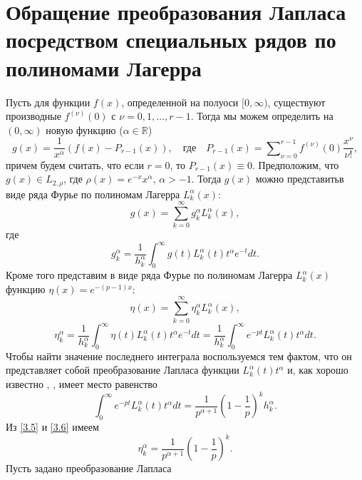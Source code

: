 \section{Обращение преобразования Лапласа посредством специальных рядов по полиномами Лагерра}
Пусть для функции $f(x)$, определенной на полуоси $[0,\infty)$, существуют производные $f^{(\nu)}(0)$ с $\nu=0,1,\ldots, r-1$. Тогда мы можем определить на $(0,\infty)$  новую функцию ($\alpha\in\mathbb{R}$)
\begin{equation}\label{3.1}
g(x)=\frac{1}{x^\alpha}(f(x)-P_{r-1}(x)),\quad \text{где} \quad P_{r-1}(x)=\sum\nolimits_{\nu=0}^{r-1}f^{(\nu)}(0)\frac{x^\nu}{\nu!},
\end{equation}
причем будем считать, что если $r=0$, то $P_{r-1}(x)\equiv0$. Предположим, что $g(x)\in L_{2,\rho}$, где $\rho(x)=e^{-x}x^\alpha$, $\alpha>-1$.
Тогда  $g(x)$ можно представитьв виде ряда Фурье по  полиномам Лагерра $L_k^\alpha(x)$:
\begin{equation}\label{3.2}
g(x)=\sum_{k=0}^{\infty} g_k^\alpha L_k^\alpha(x),
\end{equation}
где
\begin{equation}\label{3.3}
 g_k^\alpha=\frac{1}{h_k^\alpha} \int_0^\infty g(t) L_k^\alpha(t)t^\alpha e^{-t}dt.
\end{equation}
Кроме того представим в виде ряда Фурье по полиномам Лагерра $L_k^\alpha(x)$  функцию $\eta(x)=e^{-(p-1)x}$:
\begin{equation}\label{3.4}
\eta(x)=\sum_{k=0}^{\infty} \eta_k^\alpha L_k^\alpha(x),
\end{equation}
\begin{equation}\label{3.5}
 \eta_k^\alpha=\frac{1}{h_k^\alpha} \int_0^\infty \eta(t) L_k^\alpha(t)t^\alpha e^{-t}dt=\frac{1}{h_k^\alpha} \int_0^\infty e^{-pt}L_k^\alpha(t)t^\alpha dt.
\end{equation}
Чтобы найти значение последнего интеграла воспользуемся тем фактом, что он представляет собой преобразование Лапласа функции
$L_k^\alpha(t)t^\alpha$ и, как хорошо известно \cite{DitPrud}, \cite{KrylovSkob}, имеет место равенство
\begin{equation}\label{3.6}
  \int_0^\infty e^{-pt}L_k^\alpha(t)t^\alpha dt=\frac{1}{p^{\alpha+1}}\left(1-\frac1p\right)^kh_k^\alpha.
\end{equation}
Из \eqref{3.5} и \eqref{3.6} имеем
\begin{equation}\label{3.7}
 \eta_k^\alpha=\frac{1}{p^{\alpha+1}}\left(1-\frac1p\right)^k.
\end{equation}
Пусть задано преобразование Лапласа
